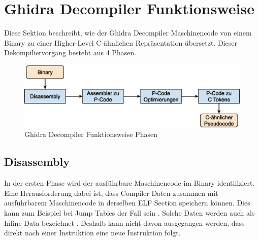 



\section{Ghidra Decompiler Funktionsweise}

Diese Sektion beschreibt, wie der Ghidra Decompiler Maschinencode von einem Binary zu einer Higher-Level C-ähnlichen Repräsentation übersetzt. Dieser Dekompiliervorgang besteht aus 4 Phasen.

\begin{figure}[!h]
	\centering
	\includegraphics[width=.45\textwidth]{img/DecompilerFunktionsweise.eps}
	\caption{Ghidra Decompiler Funktionsweise Phasen}
	\label{fig:groups}
\end{figure}

\subsection{Disassembly}

In der ersten Phase wird der ausführbare Maschinencode im Binary identifiziert. Eine Herausforderung dabei ist, dass Compiler Daten zusammen mit ausführbarem Maschinencode in derselben ELF Section speichern können. Dies kann zum Beispiel bei Jump Tables der Fall sein \cite{2}. Solche Daten werden auch als Inline Data bezeichnet \cite{2}. Deshalb kann nicht davon ausgegangen werden, dass direkt nach einer Instruktion eine neue Instruktion folgt.

